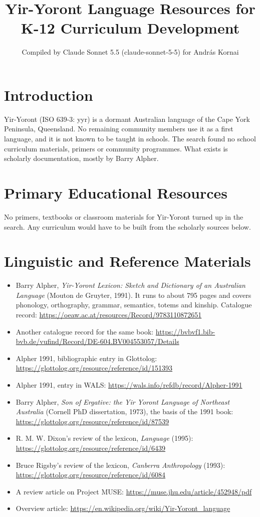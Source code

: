 \documentclass[12pt]{article}
\title{Yir-Yoront Language Resources for K-12 Curriculum Development}
\author{Compiled by Claude Sonnet 5.5 (claude-sonnet-5-5) for Andr\'as Kornai}
\date{}
\begin{document}
\maketitle

\section{Introduction}
Yir-Yoront (ISO 639-3: yyr) is a dormant Australian language of the Cape York Peninsula, Queensland. No remaining community members use it as a first language, and it is not known to be taught in schools. The search found no school curriculum materials, primers or community programmes. What exists is scholarly documentation, mostly by Barry Alpher.

\section{Primary Educational Resources}
No primers, textbooks or classroom materials for Yir-Yoront turned up in the search. Any curriculum would have to be built from the scholarly sources below.

\section{Linguistic and Reference Materials}
\begin{itemize}
\item Barry Alpher, \emph{Yir-Yoront Lexicon: Sketch and Dictionary of an Australian Language} (Mouton de Gruyter, 1991). It runs to about 795 pages and covers phonology, orthography, grammar, semantics, totems and kinship. Catalogue record: \url{https://oeaw.ac.at/resources/Record/9783110872651}
\item Another catalogue record for the same book: \url{https://bvbvf1.bib-bvb.de/vufind/Record/DE-604.BV004553057/Details}
\item Alpher 1991, bibliographic entry in Glottolog: \url{https://glottolog.org/resource/reference/id/151393}
\item Alpher 1991, entry in WALS: \url{https://wals.info/refdb/record/Alpher-1991}
\item Barry Alpher, \emph{Son of Ergative: the Yir Yoront Language of Northeast Australia} (Cornell PhD dissertation, 1973), the basis of the 1991 book: \url{https://glottolog.org/resource/reference/id/87539}
\item R. M. W. Dixon's review of the lexicon, \emph{Language} (1995): \url{https://glottolog.org/resource/reference/id/6439}
\item Bruce Rigsby's review of the lexicon, \emph{Canberra Anthropology} (1993): \url{https://glottolog.org/resource/reference/id/6084}
\item A review article on Project MUSE: \url{https://muse.jhu.edu/article/452948/pdf}
\item Overview article: \url{https://en.wikipedia.org/wiki/Yir-Yoront_language}
\end{itemize}
\end{document}
